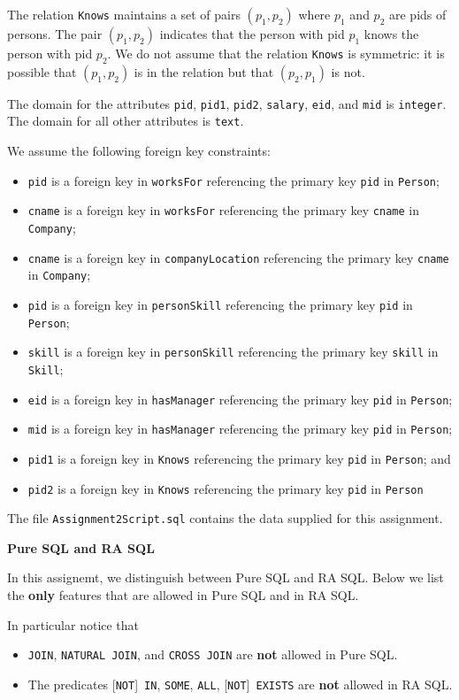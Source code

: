 \documentclass[11pt]{article}
\begin{document}
The relation {\tt Knows} maintains a set of pairs $(p_1,p_2)$ where $p_1$ 
and $p_2$ are pids of persons.   The pair $(p_1,p_2)$ indicates that the person with
pid $p_1$ knows the person with pid $p_2$.
We do not assume that the relation {\tt Knows} is
symmetric: it is possible that $(p_1,p_2)$ is in the relation but that
$(p_2,p_1)$ is not.

The domain for the attributes {\tt pid}, {\tt pid1}, {\tt pid2}, {\tt salary}, {\tt eid}, and {\tt mid} is {\tt integer}.   The domain for all other attributes is {\tt text}.

We assume the following foreign key constraints:
\begin{itemize}
\item {\tt pid} is a foreign key in {\tt worksFor} referencing the primary key {\tt pid} in {\tt Person};
\item {\tt cname} is a foreign key in {\tt worksFor} referencing the primary key {\tt cname} in {\tt Company};
\item {\tt cname} is a foreign key in {\tt companyLocation} referencing the primary key {\tt cname} in {\tt Company};
\item {\tt pid} is a foreign key in {\tt personSkill} referencing the primary key {\tt pid} in {\tt Person};
\item {\tt skill} is a foreign key in {\tt personSkill} referencing the primary key {\tt skill} in {\tt Skill};
\item {\tt eid} is a foreign key in {\tt hasManager} referencing the primary key {\tt pid} in {\tt Person}; 
\item {\tt mid} is a foreign key in {\tt hasManager} referencing the primary key {\tt pid} in {\tt Person};
\item {\tt pid1} is a foreign key in {\tt Knows} referencing the primary key {\tt pid} in {\tt Person}; and
\item {\tt pid2} is a foreign key in {\tt Knows} referencing the primary key {\tt pid} in {\tt Person}
\end{itemize}

The file {\tt Assignment2Script.sql} contains the data supplied for this assignment.
\newpage

\noindent
\large{\bf Pure SQL and RA SQL}

\bigskip
In this assignemt, we distinguish between Pure SQL and RA SQL.
Below we list the {\bf only} features that are allowed in Pure SQL and in RA SQL. 

In particular notice that 
\begin{itemize}
\item {\tt JOIN}, {\tt NATURAL~JOIN}, and {\tt CROSS~JOIN} are {\bf not} allowed in Pure SQL.
\item The predicates  [{\tt NOT}]~{\tt IN}, {\tt SOME}, {\tt ALL}, [{\tt NOT}]~{\tt EXISTS} are {\bf not} allowed in RA SQL.
\end{itemize}
\end{document}
